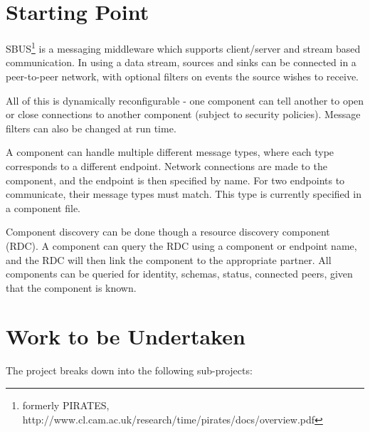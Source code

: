 \section*{Starting Point}

SBUS\footnote{formerly PIRATES, http://www.cl.cam.ac.uk/research/time/pirates/docs/overview.pdf} is a messaging middleware which supports client/server and stream based communication. In using a data stream, sources and sinks can be connected in a peer-to-peer network, with optional filters on events the source wishes to receive.

All of this is dynamically reconfigurable - one component can tell another to open or close connections to another component (subject to security policies). Message filters can also be changed at run time.

A component can handle multiple different message types, where each type corresponds to a different endpoint. Network connections are made to the component, and the endpoint is then specified by name. For two endpoints to communicate, their message types must match. This type is currently specified in a component file.

Component discovery can be done though a resource discovery component (RDC). A component can query the RDC using a component or endpoint name, and the RDC will then link the component to the appropriate partner. All components can be queried for identity, schemas, status, connected peers, given that the component is known.


\section*{Work to be Undertaken}

The project breaks down into the following sub-projects:

